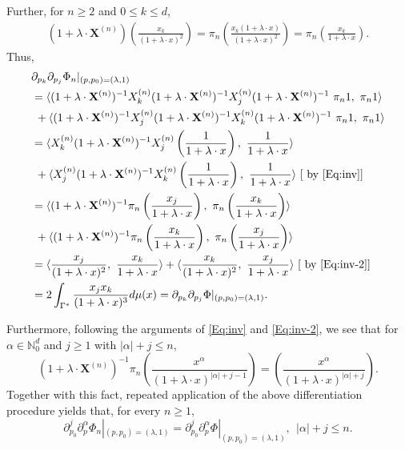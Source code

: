 \documentclass[11pt,reqno]{amsart}
\theoremstyle{plain}
\theoremstyle{definition}
\numberwithin{equation}{section}
\begin{document}
	Further, for $n \geq 2$ and $ 0 \leq k \leq d$,
	\begin{align}\label{Eq:inv-2}
	    (1+ \lambda \cdot \mathbf{X}^{(n)}) \left(\frac{x_k}{(1+ \lambda \cdot x)^2}\right) 
	= \pi_n \left( \frac{x_k (1+ \lambda \cdot x)}{(1+ \lambda \cdot x)^2} \right) = \pi_n \left( \frac{x_k}{1+ \lambda \cdot x}\right).
	\end{align}
	Thus,
	\begin{align*}
		& \partial_{p_k} \partial_{p_j} \Phi_n|_{(p, p_0)=(\lambda, 1)} \\
        & =  \langle (1+ \lambda \cdot \mathbf{X}^{(n)})^{-1} X^{(n)}_k (1+ \lambda \cdot \mathbf{X}^{(n)})^{-1} X^{(n)}_j (1+ \lambda \cdot \mathbf{X}^{(n)} )^{-1} \ \pi_n 1, \ \pi_n 1  \rangle  \\
		 & \ +  \langle (1+ \lambda \cdot \mathbf{X}^{(n)})^{-1} X^{(n)}_j (1+ \lambda \cdot \mathbf{X}^{(n)})^{-1} X^{(n)}_k (1+ \lambda \cdot \mathbf{X}^{(n)})^{-1} \ \pi_n 1, \ \pi_n 1  \rangle \\ 
		&=  \langle X^{(n)}_k (1+ \lambda \cdot \mathbf{X}^{(n)} )^{-1} X^{(n)}_j \left(\frac{1}{1+ \lambda \cdot x} \right), \ \frac{1}{1+ \lambda \cdot x}  \rangle  \\
		& \ +  \langle  X^{(n)}_j (1+ \lambda \cdot \mathbf{X}^{(n)})^{-1} X^{(n)}_k \left(\frac{1}{1+ \lambda \cdot x}\right), \ \frac{1}{1+ \lambda \cdot x}  \rangle \ [\text{ by } \eqref{Eq:inv}]\\ 
		&=  \langle  (1+ \lambda \cdot \mathbf{X}^{(n)} )^{-1} \pi_n \left(\frac{x_j}{1+ \lambda \cdot x} \right), \ \pi_n \left( \frac{x_k}{1+ \lambda \cdot x} \right) \rangle  \\
		&  \ +  \langle   (1+ \lambda \cdot \mathbf{X}^{(n)})^{-1} \pi_n \left(\frac{x_k}{1+ \lambda \cdot x}\right), \ \pi_n \left( \frac{x_j}{1+ \lambda \cdot x} \right)  \rangle  \\
		&= \langle  \frac{x_j}{(1+ \lambda \cdot x)^2} , \ \frac{x_k}{1+ \lambda \cdot x} \rangle  +  \langle   \frac{x_k}{(1+ \lambda \cdot x)^2}, \ \frac{x_j}{1+ \lambda \cdot x}  \rangle \ [\text{ by } \eqref{Eq:inv-2}] \\ 
		&= 2 \int_{\Gamma^*} \frac{x_j x_k}{(1+ \lambda \cdot x)^3} d\mu(x) = \partial_{p_k} \partial_{p_j} \Phi|_{(p, p_0)=(\lambda, 1)}.
	\end{align*}

	Furthermore, following the arguments of \eqref{Eq:inv} and \eqref{Eq:inv-2}, we see that
    for $\alpha \in \mathbb{N}_0^d$ and $j \geq 1$ with $|\alpha| + j\leq n$,
	$$
	(1+ \lambda \cdot \mathbf{X}^{(n)} )^{-1} \pi_n \left( \frac{x^\alpha}{ (1+ \lambda \cdot x)^{|\alpha|+j-1 }} \right) = \left( \frac{x^\alpha}{ (1+ \lambda \cdot x)^{|\alpha|+j}}\right).
	$$
    Together with this fact, repeated application of the above differentiation procedure yields that, for every $n \geq 1$,
	$$ \partial^j_{p_0} \partial^\alpha_p \Phi_n|_{(p, p_0)= (\lambda, 1)} = \partial^j_{p_0} \partial^\alpha_p \Phi|_{(p, p_0)= (\lambda, 1)}, \ \ |\alpha|+j \leq n.$$
	
\end{document}
